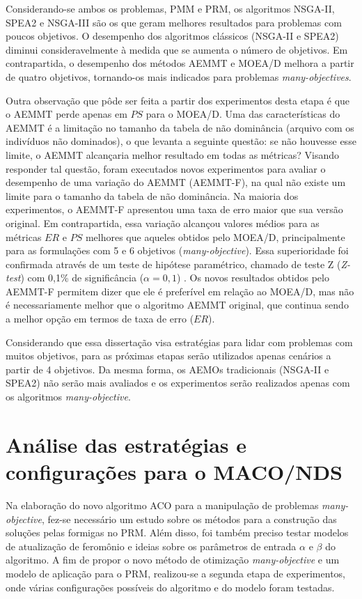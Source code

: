 Considerando-se ambos os problemas, PMM e PRM, os algoritmos NSGA-II, SPEA2 e NSGA-III são os que geram melhores resultados para problemas com poucos objetivos. O desempenho dos algoritmos clássicos (NSGA-II e SPEA2) diminui consideravelmente à medida que se aumenta o número de objetivos. Em contrapartida, o desempenho dos métodos AEMMT e MOEA/D melhora a partir de quatro objetivos, tornando-os mais indicados para problemas \textit{many-objectives}.

Outra observação que pôde ser feita a partir dos experimentos desta etapa é que o AEMMT perde apenas em $PS$ para o MOEA/D. Uma das características do AEMMT é a limitação no tamanho da tabela de não dominância (arquivo com os indivíduos não dominados), o que levanta a seguinte questão: se não houvesse esse limite, o AEMMT alcançaria melhor resultado em todas as métricas? Visando responder tal questão, foram executados novos experimentos para avaliar o desempenho de uma variação do AEMMT (AEMMT-F), na qual não existe um limite para o tamanho da tabela de não dominância. Na maioria dos experimentos, o AEMMT-F apresentou uma taxa de erro maior que sua versão original. Em contrapartida, essa variação alcançou valores médios para as métricas $ER$ e $PS$ melhores que aqueles obtidos pelo MOEA/D, principalmente para as formulações com 5 e 6 objetivos (\textit{many-objective}). Essa superioridade foi confirmada através de um teste de hipótese paramétrico, chamado de teste Z (\textit{Z-test}) com 0,1\% de significância ($\alpha = 0,1$) \cite{Franca2018}. Os novos resultados obtidos pelo AEMMT-F permitem dizer que ele é preferível em relação ao MOEA/D, mas não é necessariamente melhor que o algoritmo AEMMT original, que continua sendo a melhor opção em termos de taxa de erro ($ER$). 

Considerando que essa dissertação visa estratégias para lidar com problemas com muitos objetivos, para as próximas etapas serão utilizados apenas cenários a partir de 4 objetivos. Da mesma forma, os AEMOs tradicionais (NSGA-II e SPEA2) não serão mais avaliados e os experimentos serão realizados apenas com os algoritmos \textit{many-objective}.

\section{Análise das estratégias e configurações para o MACO/NDS}
\label{section_experimentos_etapa2}

Na elaboração do novo algoritmo ACO para a manipulação de problemas \textit{many-objective}, fez-se necessário um estudo sobre os métodos para a construção das soluções pelas formigas no PRM. Além disso, foi também preciso testar modelos de atualização de feromônio e ideias sobre os parâmetros de entrada $\alpha$ e $\beta$ do algoritmo. A fim de propor o novo método de otimização \textit{many-objective} e um modelo de aplicação para o PRM, realizou-se a segunda etapa de experimentos, onde várias configurações possíveis do algoritmo e do modelo foram testadas.

